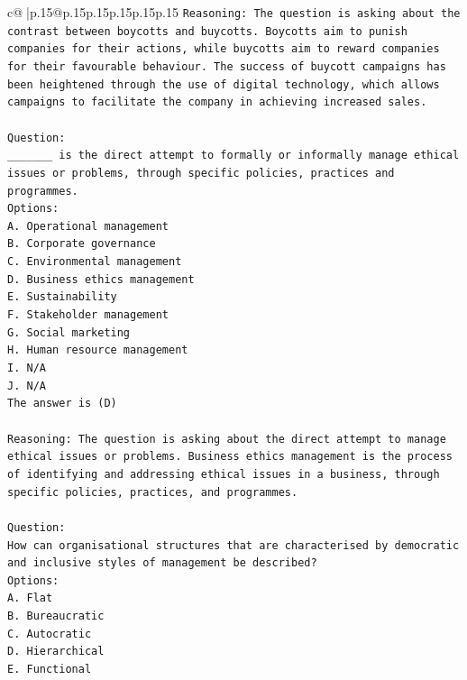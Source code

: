 \documentclass{article}
\begin{document}
{\begin{supertabular}{c@{$\;$}|p{.15\linewidth}@{}p{.15\linewidth}p{.15\linewidth}p{.15\linewidth}p{.15\linewidth}p{.15\linewidth}}
{{{\texttt{Reasoning: The question is asking about the contrast between boycotts and buycotts. Boycotts aim to punish companies for their actions, while buycotts aim to reward companies for their favourable behaviour. The success of buycott campaigns has been heightened through the use of digital technology, which allows campaigns to facilitate the company in achieving increased sales.} \\
\\ 
\texttt{Question:} \\
\texttt{\_\_\_\_\_\_\_ is the direct attempt to formally or informally manage ethical issues or problems, through specific policies, practices and programmes.} \\
\texttt{Options:} \\
\texttt{A. Operational management} \\
\texttt{B. Corporate governance} \\
\texttt{C. Environmental management} \\
\texttt{D. Business ethics management} \\
\texttt{E. Sustainability} \\
\texttt{F. Stakeholder management} \\
\texttt{G. Social marketing} \\
\texttt{H. Human resource management} \\
\texttt{I. N/A} \\
\texttt{J. N/A} \\
\texttt{The answer is (D)} \\
\\ 
\texttt{Reasoning: The question is asking about the direct attempt to manage ethical issues or problems. Business ethics management is the process of identifying and addressing ethical issues in a business, through specific policies, practices, and programmes.} \\
\\ 
\texttt{Question:} \\
\texttt{How can organisational structures that are characterised by democratic and inclusive styles of management be described?} \\
\texttt{Options:} \\
\texttt{A. Flat} \\
\texttt{B. Bureaucratic} \\
\texttt{C. Autocratic} \\
\texttt{D. Hierarchical} \\
\texttt{E. Functional} \\
}}}
\end{supertabular}}
\end{document}
